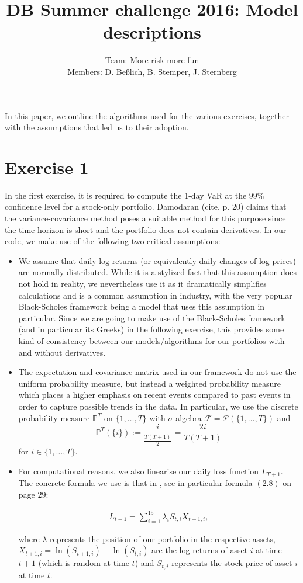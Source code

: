 \documentclass[10pt,a4paper]{article}
\title{DB Summer challenge 2016: Model descriptions}
\author{Team: More risk more fun \\
		Members: D. Be{\ss}lich,  B. Stemper, J. Sternberg}
\theoremstyle{definition}
\begin{document}
	
	\maketitle
	
	In this paper, we outline the algorithms used for the various exercises, together with the assumptions that led us to their adoption.
	
	\section*{Exercise 1}
	
	In the first exercise, it is required to compute the 1-day VaR at the $99\%$ confidence level for a stock-only portfolio. Damodaran  (cite, p. 20) claims that the variance-covariance method poses a suitable method for this purpose since the time horizon is short and the portfolio does not contain derivatives. In our code, we make use of the following two critical assumptions:
	
	\begin{itemize}
	
	\item We assume that daily log returns (or equivalently daily changes of log prices)
	 are normally distributed. While it is a stylized fact that this assumption does not 
	 hold in reality, we nevertheless use it as it dramatically simplifies calculations
	  and is a common assumption in industry, with the very popular Black-Scholes 
	  framework being a model that uses this assumption in particular. Since we are
	   going to make use of the Black-Scholes framework (and in particular its Greeks) 
	   in the following exercise, this provides some kind of consistency between our
	    models/algorithms for our portfolios with and without derivatives.
	    
	\item The expectation and covariance matrix used in our framework do not use the uniform probability measure, 
	but instead a weighted probability measure which places a higher emphasis on recent events compared to past events in order to capture possible trends in the data. In particular, we use the discrete probability measure $\mathbb{P}^T$ on $\{1,\dots,T\}$ with $\sigma$-algebra $\mathcal{F}=\mathcal{P}(\{1,\dots,T\})$ and
	\[
		\mathbb{P}^T(\{i\}):=\frac{i}{\frac{T(T+1)}{2}}=\frac{2i}{T(T+1)}
	\]
	for $i\in \{1,\dots,T\}$.

	
	\item For computational reasons, we also linearise our daily loss function $L_{T+1}$. The concrete formula we use is that in \cite{QRM}, see in particular formula $(2.8)$ on page $29$:
	
	\begin{align*}
	L_{t+1} = \sum_{i=1}^{15} \lambda_i S_{t,i}X_{t+1,i},
	\end{align*}
	
	where $\lambda$ represents the position of our portfolio in the respective assets, 
	$X_{t+1,i}=\ln(S_{t+1,i})-\ln(S_{t,i})$ are
	the log returns of asset $i$ at time $t+1$ (which is random at time $t$) 
	and $S_{t,i}$ represents the stock price of asset $i$ at time $t$.
	\end{itemize}
	
\end{document}
